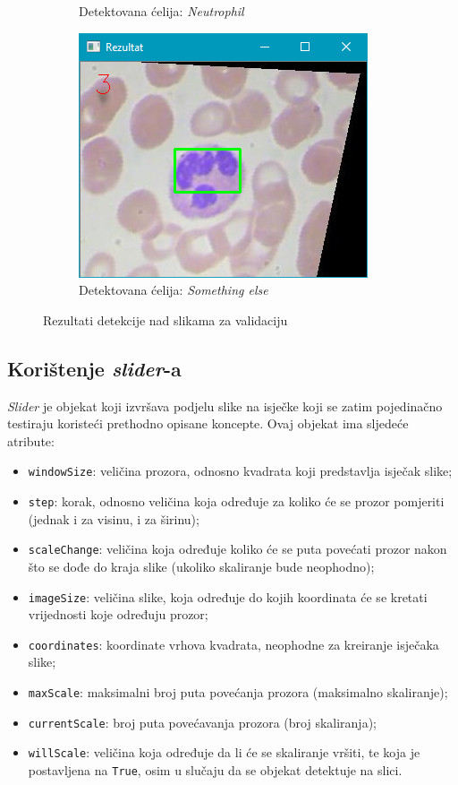 \documentclass[12pt,a4paper]{article}
\begin{document}
\begin{figure}[H]
\begin{subfigure}{.5\textwidth}
  \caption{Detektovana ćelija: \textit{Neutrophil}}
\end{subfigure}
\begin{subfigure}{.5\textwidth}
  \centering
  \includegraphics[scale=.9]{slikaMain4.png}
  \caption{Detektovana ćelija: \textit{Something else}}
\end{subfigure}
\caption{Rezultati detekcije nad slikama za validaciju}
\end{figure}

\newpage

\subsection{Korištenje \textit{slider}-a}

\textit{Slider} je objekat koji izvršava podjelu slike na isječke koji se zatim pojedinačno testiraju koristeći prethodno opisane koncepte. Ovaj objekat ima sljedeće atribute:

\begin{itemize}
\renewcommand\labelitemi{--}
\item \texttt{windowSize}: veličina prozora, odnosno kvadrata koji predstavlja isječak slike;
\item \texttt{step}: korak, odnosno veličina koja određuje za koliko će se prozor pomjeriti (jednak i za visinu, i za širinu);
\item \texttt{scaleChange}: veličina koja određuje koliko će se puta povećati prozor nakon što se dođe do kraja slike (ukoliko skaliranje bude neophodno);
\item \texttt{imageSize}: veličina slike, koja određuje do kojih koordinata će se kretati vrijednosti koje određuju prozor;
\item \texttt{coordinates}: koordinate vrhova kvadrata, neophodne za kreiranje isječaka slike;
\item \texttt{maxScale}: maksimalni broj puta povećanja prozora (maksimalno skaliranje);
\item \texttt{currentScale}: broj puta povećavanja prozora (broj skaliranja);
\item \texttt{willScale}: veličina koja određuje da li će se skaliranje vršiti, te koja je postavljena na \texttt{True}, osim u slučaju da se objekat detektuje na slici.

\end{itemize}
\end{document}
